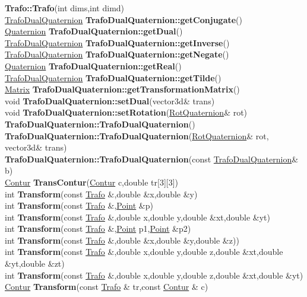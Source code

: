 \documentclass[10pt,titlepage]{article}
\def\functionlistentry#1#2#3#4#5#6{\noindent #1 {\bf #2}(#3) \dotfill #6\\}
\begin{document}
{{\functionlistentry{}{Trafo::Trafo}{int dims,int dimd}{683}{geoTrafo}{}
\functionlistentry{\hyperlink{TrafoDualQuaternion}{TrafoDualQuaternion}}{TrafoDualQuaternion::getConjugate}{}{1534}{quaternions}{}
\functionlistentry{\hyperlink{Quaternion}{Quaternion}}{TrafoDualQuaternion::getDual}{}{1530}{quaternions}{}
\functionlistentry{\hyperlink{TrafoDualQuaternion}{TrafoDualQuaternion}}{TrafoDualQuaternion::getInverse}{}{1536}{quaternions}{}
\functionlistentry{\hyperlink{TrafoDualQuaternion}{TrafoDualQuaternion}}{TrafoDualQuaternion::getNegate}{}{1533}{quaternions}{}
\functionlistentry{\hyperlink{Quaternion}{Quaternion}}{TrafoDualQuaternion::getReal}{}{1529}{quaternions}{}
\functionlistentry{\hyperlink{TrafoDualQuaternion}{TrafoDualQuaternion}}{TrafoDualQuaternion::getTilde}{}{1535}{quaternions}{}
\functionlistentry{\hyperlink{Matrix}{Matrix}}{TrafoDualQuaternion::getTransformationMatrix}{}{1537}{quaternions}{}
\functionlistentry{void}{TrafoDualQuaternion::setDual}{vector3d\& trans}{1532}{quaternions}{}
\functionlistentry{void}{TrafoDualQuaternion::setRotation}{\hyperlink{RotQuaternion}{RotQuaternion}\& rot}{1531}{quaternions}{}
\functionlistentry{}{TrafoDualQuaternion::TrafoDualQuaternion}{}{1526}{quaternions}{}
\functionlistentry{}{TrafoDualQuaternion::TrafoDualQuaternion}{\hyperlink{RotQuaternion}{RotQuaternion}\& rot, vector3d\& trans}{1527}{quaternions}{}
\functionlistentry{}{TrafoDualQuaternion::TrafoDualQuaternion}{const \hyperlink{TrafoDualQuaternion}{TrafoDualQuaternion}\& b}{1528}{quaternions}{}
\functionlistentry{\hyperlink{Contur}{Contur}}{TransContur}{\hyperlink{Contur}{Contur} c,double tr[3][3]}{1593}{obsolet}{}
\functionlistentry{int}{Transform}{const \hyperlink{Trafo}{Trafo} \&,double \&x,double \&y}{714}{geoTrafo}{}
\functionlistentry{int}{Transform}{const \hyperlink{Trafo}{Trafo} \&,\hyperlink{Point}{Point} \&p}{715}{geoTrafo}{}
\functionlistentry{int}{Transform}{const \hyperlink{Trafo}{Trafo} \&,double x,double y,double \&xt,double \&yt}{716}{geoTrafo}{}
\functionlistentry{int}{Transform}{const \hyperlink{Trafo}{Trafo} \&,\hyperlink{Point}{Point} p1,\hyperlink{Point}{Point} \&p2}{717}{geoTrafo}{}
\functionlistentry{int}{Transform}{const \hyperlink{Trafo}{Trafo} \&,double \&x,double \&y,double \&z)}{720}{geoTrafo}{}
\functionlistentry{int}{Transform}{const \hyperlink{Trafo}{Trafo} \&,double x,double y,double z,double \&xt,double \&yt,double \&zt}{721}{geoTrafo}{}
\functionlistentry{int}{Transform}{const \hyperlink{Trafo}{Trafo} \&,double x,double y,double z,double \&xt,double \&yt}{722}{geoTrafo}{}
\functionlistentry{\hyperlink{Contur}{Contur}}{Transform}{const \hyperlink{Trafo}{Trafo} \& tr,const \hyperlink{Contur}{Contur} \& c}{725}{geoTrafo}{}
}}
\end{document}
